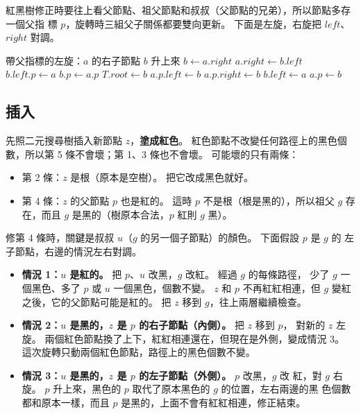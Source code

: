 紅黑樹修正時要往上看父節點、祖父節點和叔叔（父節點的兄弟），所以節點多存一個父指
標 $p$，旋轉時三組父子關係都要雙向更新。 下面是左旋，右旋把 $\mathit{left}$、
$\mathit{right}$ 對調。

\begin{pseudo}[label=alg:bal-left-rotate]{帶父指標的左旋：$a$ 的右子節點 $b$ 升上來}
    \State $b \gets a.\mathit{right}$
    \State $a.\mathit{right} \gets b.\mathit{left}$ 
        \State $b.\mathit{left}.p \gets a$
    \EndIf
    \State $b.p \gets a.p$ 
        \State $T.\mathit{root} \gets b$
        \State $a.p.\mathit{left} \gets b$
    \Else
        \State $a.p.\mathit{right} \gets b$
    \EndIf
    \State $b.\mathit{left} \gets a$
    \State $a.p \gets b$
\EndProcedure
\end{pseudo}

\subsection{插入}
\label{sec:bal-rb-insert}

先照二元搜尋樹插入新節點 $z$，\textbf{塗成紅色}。 紅色節點不改變任何路徑上的黑色個
數，所以第 5 條不會壞；第 1、3 條也不會壞。 可能壞的只有兩條：
\begin{itemize}
\item 第 2 條：$z$ 是根（原本是空樹）。 把它改成黑色就好。
\item 第 4 條：$z$ 的父節點 $p$ 也是紅的。 這時 $p$ 不是根（根是黑的），所以祖父
$g$ 存在，而且 $g$ 是黑的（樹原本合法，$p$ 紅則 $g$ 黑）。
\end{itemize}

修第 4 條時，關鍵是叔叔 $u$（$g$ 的另一個子節點）的顏色。 下面假設 $p$ 是 $g$ 的
左子節點，右邊的情況左右對調。

\begin{itemize}
\item \textbf{情況 1：$u$ 是紅的。} 把 $p$、$u$ 改黑，$g$ 改紅。 經過 $g$ 的每條路徑，
少了 $g$ 一個黑色、多了 $p$ 或 $u$ 一個黑色，個數不變。 $z$ 和 $p$ 不再紅紅相連，但
$g$ 變紅之後，它的父節點可能是紅的。 把 $z$ 移到 $g$，往上兩層繼續檢查。
\item \textbf{情況 2：$u$ 是黑的，$z$ 是 $p$ 的右子節點（內側）。} 把 $z$ 移到 $p$，
對新的 $z$ 左旋。 兩個紅色節點換了上下，紅紅相連還在，但現在是外側，變成情況 3。
這次旋轉只動兩個紅色節點，路徑上的黑色個數不變。
\item \textbf{情況 3：$u$ 是黑的，$z$ 是 $p$ 的左子節點（外側）。} $p$ 改黑，$g$ 改
紅，對 $g$ 右旋。 $p$ 升上來，黑色的 $p$ 取代了原本黑色的 $g$ 的位置，左右兩邊的黑
色個數都和原本一樣，而且 $p$ 是黑的，上面不會有紅紅相連，修正結束。
\end{itemize}


